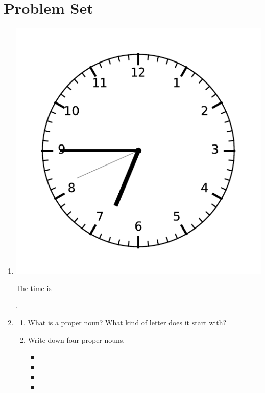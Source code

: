 \documentclass{tufte-book}
\begin{document}
\clearpage\section{Problem Set }
\begin{enumerate}
  \item \begin{marginfigure}\includegraphics[width=\textwidth]{maths/fig/clock_0645.pdf}\end{marginfigure}
  The time is \dotfill\bigskip\par\dotfill\bigskip.\par

  \item \begin{enumerate}
  \item What is a proper noun? What kind of letter does it start with?\bigskip\par
  \dotfill\bigskip \par
  \dotfill
  
  \item Write down four proper nouns.
  \begin{multicols}{2}
  \begin{itemize}
    \item \dotfill\bigskip
    \item \dotfill\bigskip
    \item \dotfill\bigskip
    \item \dotfill\bigskip
  \end{itemize}
  \end{multicols}


\end{enumerate}
\end{enumerate}
\end{document}
